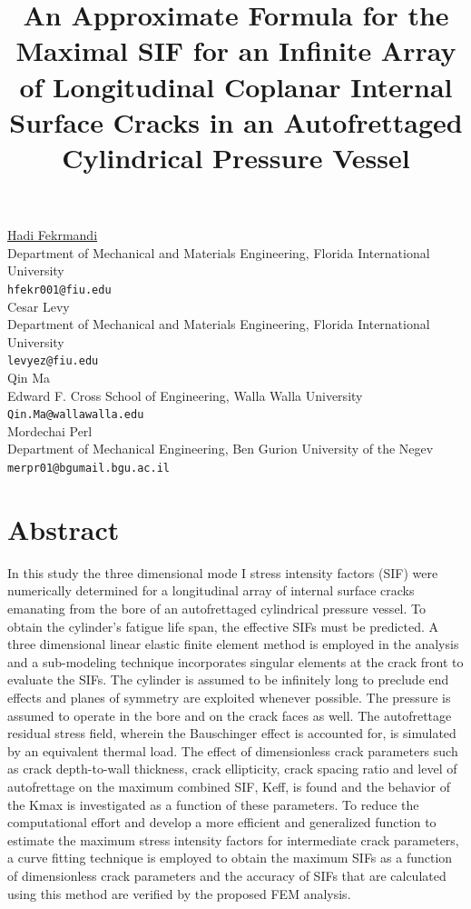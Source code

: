 \documentclass[article, A4, 11pt]{llncs}%
\begin{document}
\title{An Approximate Formula for the Maximal SIF for an Infinite Array of Longitudinal Coplanar Internal Surface Cracks in an Autofrettaged Cylindrical Pressure Vessel}
 \author{} \institute{}
\maketitle
\begin{center}
{\large \underline{Hadi  Fekrmandi}}\\
Department of Mechanical and Materials Engineering, Florida International University\\
{\tt hfekr001@fiu.edu}
\\ \vspace{4mm}
{\large Cesar  Levy}\\
Department of Mechanical and Materials Engineering, Florida International University\\
{\tt levyez@fiu.edu}
\\ \vspace{4mm}
{\large Qin Ma}\\
Edward F. Cross School of Engineering, Walla Walla University\\
{\tt Qin.Ma@wallawalla.edu}
\\ \vspace{4mm}
{\large Mordechai Perl}\\
Department of Mechanical Engineering, Ben Gurion University of the Negev\\
{\tt merpr01@bgumail.bgu.ac.il}
\end{center}

\section*{Abstract}
In this study the three dimensional mode I stress intensity factors (SIF) were numerically determined for a longitudinal array of internal surface cracks emanating from the bore of an autofrettaged cylindrical pressure vessel. To obtain the cylinder’s fatigue life span, the effective SIFs must be predicted. 
A three dimensional linear elastic finite element method is employed in the analysis and a sub-modeling technique incorporates singular elements at the crack front to evaluate the SIFs. The cylinder is assumed to be infinitely long to preclude end effects and planes of symmetry are exploited whenever possible. The pressure is assumed to operate in the bore and on the crack faces as well. The autofrettage residual stress field, wherein the Bauschinger effect is accounted for, is simulated by an equivalent thermal load. The effect of dimensionless crack parameters such as crack depth-to-wall thickness, crack ellipticity, crack spacing ratio and level of autofrettage on the maximum combined SIF, Keff, is found and the behavior of the Kmax is investigated as a function of these parameters. 
    To reduce the computational effort and develop a more efficient and generalized function to estimate the maximum stress intensity factors for intermediate crack parameters, a curve fitting technique is employed to obtain the maximum SIFs as a function of dimensionless crack parameters and the accuracy of SIFs that are calculated using this method are verified by the proposed FEM analysis. 
\end{document}
